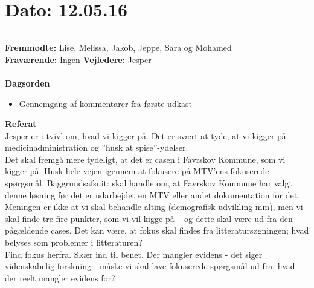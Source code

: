 

\section{Dato: 12.05.16}
\hrule

\textbf{Fremmødte:} Lise, Melissa, Jakob, Jeppe, Sara og Mohamed \\
\textbf{Fraværende:} Ingen
\textbf{Vejledere:} Jesper
\\
\\
\textbf{Dagsorden}
\begin{itemize}
	\item Gennemgang af kommentarer fra første udkast \\ 
\end{itemize}


\textbf{Referat} 
\\
Jesper er i tvivl om, hvad vi kigger på. Det er svært at tyde, at vi kigger på medicinadministration og ”husk at spise”-ydelser. \\
Det skal fremgå mere tydeligt, at det er casen i Favrskov Kommune, som vi kigger på. Husk hele vejen igennem at fokusere på MTV’ens fokuserede spørgsmål. 
Baggrundsafsnit: skal handle om, at Favrskov Kommune har valgt denne løsning før det er udarbejdet en MTV eller andet dokumentation for det. Meningen er ikke at vi skal behandle alting (demografisk udvikling mm), men vi skal finde tre-fire punkter, som vi vil kigge på – og dette skal være ud fra den pågældende cases. Det kan være, at fokus skal findes fra litteratursøgningen; hvad belyses som problemer i litteraturen? \\ Find fokus herfra. 
Skær ind til benet. 
Der mangler evidens - det siger videnskabelig forskning - måske vi skal lave fokuserede spørgsmål ud fra, hvad der reelt mangler evidens for? \\


